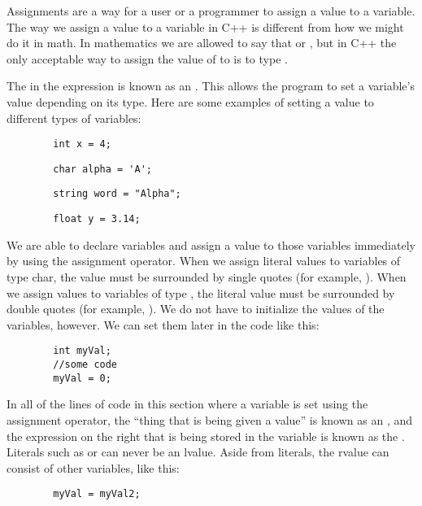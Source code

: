 
Assignments are a way for a user or a programmer to assign a value to a variable. 
The way we assign a value to a variable in C++ is different from how we might do it in math. 
In mathematics we are allowed to say that  or , but in C++ the only acceptable way to assign the value of  to  is to type . 

The \Code{=} in the expression  is known as an . 
This allows the program to set a variable's value depending on its type. 
Here are some examples of setting a value to different types of variables:

\begin{lstlisting}
		int x = 4;
\end{lstlisting}
\begin{lstlisting}
		char alpha = 'A';
\end{lstlisting}
\begin{lstlisting}
		string word = "Alpha";
\end{lstlisting}
\begin{lstlisting}
		float y = 3.14;
\end{lstlisting}

We are able to declare variables and assign a value to those variables immediately by using the assignment operator. 
When we assign literal values to variables of type char, the value must be surrounded by single quotes (for example, ). 
When we assign values to variables of type , the literal value must be surrounded by double quotes (for example, ). 
We do not have to initialize the values of the variables, however. 
We can set them later in the code like this:

\begin{lstlisting}
		int myVal;
		//some code
		myVal = 0; 
\end{lstlisting}

In all of the lines of code in this section where a variable is set using the assignment operator, the ``thing that is being given a value'' is known as an , and the expression on the right that is being stored in the variable is known as the . 
Literals such as  or  can never be an lvalue. 
Aside from literals, the rvalue can consist of other variables, like this:

\begin{lstlisting}
		myVal = myVal2;
\end{lstlisting}

